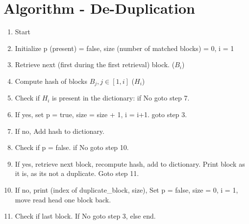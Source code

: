 \documentclass{article}
\begin{document}
   \section{Algorithm - De-Duplication}
   \begin{enumerate}  
   \item Start
   \item Initialize p (present) = false, size (number of matched blocks) = 0, i = 1
   \item Retrieve next (first during the first retrieval) block. ($B_i$)
   \item Compute hash of blocks $B_j, j \in [1,i]$  ($H_i$)
   \item Check if $H_i$ is present in the dictionary: if No goto step 7.
   \item If yes, set p = true, size = size + 1, i = i+1. goto step 3.
   \item If no, Add hash to dictionary.
   \item Check if p = false. if No goto step 10.
   \item If yes, retrieve next block, recompute hash, add to dictionary. Print block as it is, as its not a duplicate. Goto step 11.
   \item If no, print  (index of duplicate\_block, size), Set p = false, size = 0, i = 1, move read head one block back.
   \item Check if last block. If No goto step 3, else end.
\end{enumerate}  
\end{document}
